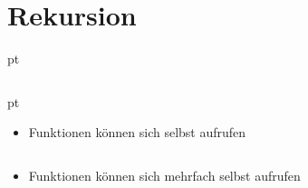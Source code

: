 \livecoding

\subtitle{Kapitel 6: wie Funktionen funktionieren}

\section{Rekursion}
\begin{frame}[t]
    \slidehead

     pt
    \begin{columns}
        \begin{column}{4.5cm}
             pt
            \begin{itemize}
                \item Funktionen können sich selbst aufrufen
            \end{itemize}
        \end{column}

        \begin{column}{7cm}
            \begin{figure}
            \end{figure}
        \end{column}
    \end{columns}
\end{frame}

\begin{frame}[t]
    \slidehead

    \begin{itemize}
        \item Funktionen können sich mehrfach selbst aufrufen
    \end{itemize}

    \begin{columns}
        \begin{column}{5cm}
            \begin{figure}
            \end{figure}
        \end{column}

        \begin{column}{5cm}
            \begin{figure}
            \end{figure}
        \end{column}
    \end{columns}
\end{frame}

